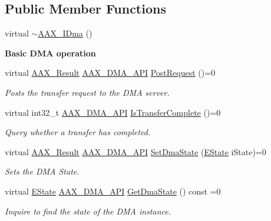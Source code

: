 \subsection*{Public Member Functions}
\begin{DoxyCompactItemize}
\item 
virtual \mbox{\hyperlink{a01809_a6e3ec99b5c67a48fa9d53087c833a990}{$\sim$\+A\+A\+X\+\_\+\+I\+Dma}} ()
\end{DoxyCompactItemize}
\begin{Indent}\textbf{ Basic D\+MA operation}\par
\begin{DoxyCompactItemize}
\item 
virtual \mbox{\hyperlink{a00392_a4d8f69a697df7f70c3a8e9b8ee130d2f}{A\+A\+X\+\_\+\+Result}} \mbox{\hyperlink{a00587_acae60d01e5e4bd3282369d0d9d378f3f}{A\+A\+X\+\_\+\+D\+M\+A\+\_\+\+A\+PI}} \mbox{\hyperlink{a01809_ac732944930f4fce9c47b59fe278eddc1}{Post\+Request}} ()=0
\begin{DoxyCompactList}\small\item\em Posts the transfer request to the D\+MA server. \end{DoxyCompactList}\item 
virtual int32\+\_\+t \mbox{\hyperlink{a00587_acae60d01e5e4bd3282369d0d9d378f3f}{A\+A\+X\+\_\+\+D\+M\+A\+\_\+\+A\+PI}} \mbox{\hyperlink{a01809_a44981285d022e5ddee41d903eed68a7d}{Is\+Transfer\+Complete}} ()=0
\begin{DoxyCompactList}\small\item\em Query whether a transfer has completed. \end{DoxyCompactList}\item 
virtual \mbox{\hyperlink{a00392_a4d8f69a697df7f70c3a8e9b8ee130d2f}{A\+A\+X\+\_\+\+Result}} \mbox{\hyperlink{a00587_acae60d01e5e4bd3282369d0d9d378f3f}{A\+A\+X\+\_\+\+D\+M\+A\+\_\+\+A\+PI}} \mbox{\hyperlink{a01809_a4d1a182655fef78b18d564a5669bae18}{Set\+Dma\+State}} (\mbox{\hyperlink{a01809_a64e694fd40d32179e429eb7934a64842}{E\+State}} i\+State)=0
\begin{DoxyCompactList}\small\item\em Sets the D\+MA State. \end{DoxyCompactList}\item 
virtual \mbox{\hyperlink{a01809_a64e694fd40d32179e429eb7934a64842}{E\+State}} \mbox{\hyperlink{a00587_acae60d01e5e4bd3282369d0d9d378f3f}{A\+A\+X\+\_\+\+D\+M\+A\+\_\+\+A\+PI}} \mbox{\hyperlink{a01809_ab5cf4ad618853e4a94ed63a693d7b800}{Get\+Dma\+State}} () const =0
\begin{DoxyCompactList}\small\item\em Inquire to find the state of the D\+MA instance. \end{DoxyCompactList}\item 

\end{DoxyCompactItemize}
\end{Indent}
